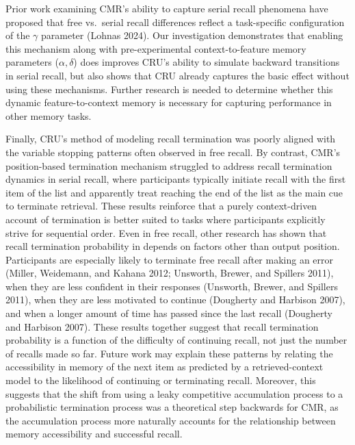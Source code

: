 \documentclass[
  letterpaper,
  11pt,
  english,
  singlespacing,
  headsepline]{MastersDoctoralThesis}
\begin{document}
Prior work examining CMR's ability to capture serial recall phenomena
have proposed that free vs.~serial recall differences reflect a
task-specific configuration of the \(\gamma\) parameter (Lohnas 2024).
Our investigation demonstrates that enabling this mechanism along with
pre-experimental context-to-feature memory parameters
(\(\alpha, \delta\)) does improves CRU's ability to simulate backward
transitions in serial recall, but also shows that CRU already captures
the basic effect without using these mechanisms. Further research is
needed to determine whether this dynamic feature-to-context memory is
necessary for capturing performance in other memory tasks.

Finally, CRU's method of modeling recall termination was poorly aligned
with the variable stopping patterns often observed in free recall. By
contrast, CMR's position-based termination mechanism struggled to
address recall termination dynamics in serial recall, where participants
typically initiate recall with the first item of the list and apparently
treat reaching the end of the list as the main cue to terminate
retrieval. These results reinforce that a purely context-driven account
of termination is better suited to tasks where participants explicitly
strive for sequential order. Even in free recall, other research has
shown that recall termination probability in depends on factors other
than output position. Participants are especially likely to terminate
free recall after making an error (Miller, Weidemann, and Kahana 2012;
Unsworth, Brewer, and Spillers 2011), when they are less confident in
their responses (Unsworth, Brewer, and Spillers 2011), when they are
less motivated to continue (Dougherty and Harbison 2007), and when a
longer amount of time has passed since the last recall (Dougherty and
Harbison 2007). These results together suggest that recall termination
probability is a function of the difficulty of continuing recall, not
just the number of recalls made so far. Future work may explain these
patterns by relating the accessibility in memory of the next item as
predicted by a retrieved-context model to the likelihood of continuing
or terminating recall. Moreover, this suggests that the shift from using
a leaky competitive accumulation process to a probabilistic termination
process was a theoretical step backwards for CMR, as the accumulation
process more naturally accounts for the relationship between memory
accessibility and successful recall.
\end{document}
